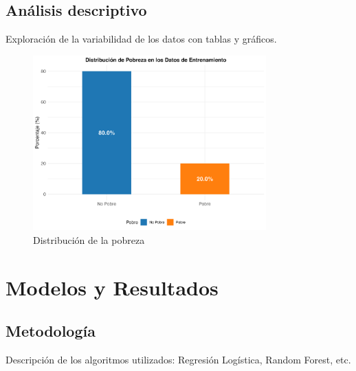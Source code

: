 \documentclass[12pt,a4paper,onecolumn]{article}
\begin{document}
\subsection{Análisis descriptivo}
Exploración de la variabilidad de los datos con tablas y gráficos.

\begin{figure}[htbp]
    \centering
    \includegraphics[width=0.8\textwidth]{../views/figures/poverty_distribution.png}
    \caption{Distribución de la pobreza}
    \label{fig:distribución_pobreza}
\end{figure}

















\section{Modelos y Resultados}
\subsection{Metodología}
Descripción de los algoritmos utilizados: Regresión Logística, Random Forest, etc.
\end{document}
